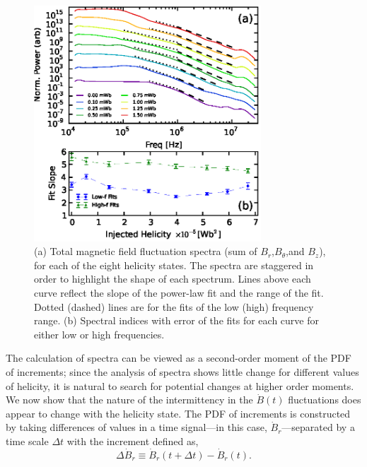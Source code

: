 \documentclass[aps,prl,amsmath,amssymb,reprint,superscriptaddress]{revtex4-1} %
\begin{document}
\begin{figure}[!htbp]
\centerline{
\includegraphics[width=8.5cm]{figure2.eps}}
\caption{\label{fig:Btot_spectra} (a) Total magnetic field fluctuation spectra (sum of $B_r$,$B_{\theta}$,and $B_{z}$), for each of the eight helicity states. The spectra are staggered in order to highlight the shape of each spectrum. Lines above each curve reflect the slope of the power-law fit and the range of the fit. Dotted (dashed) lines are for the fits of the low (high) frequency range. (b) Spectral indices with error of the fits for each curve for either low or high frequencies.}
\end{figure}

The calculation of spectra can be viewed as a second-order moment of the PDF of increments; since the analysis of spectra shows little change for different values of helicity, it is natural to search for potential changes at higher order moments. We now show that the nature of the intermittency in the $\dot{B}(t)$ fluctuations does appear to change with the helicity state. The PDF of increments is constructed by taking differences of values in a time signal---in this case, $\dot{B}_{r}$---separated by a time scale $\Delta t$ with the increment defined as,
\begin{equation}
\Delta \dot{B}_r \equiv \dot{B}_r(t + \Delta t)- \dot{B}_r(t).
\label{eq:increment}
\end{equation}
\end{document}
